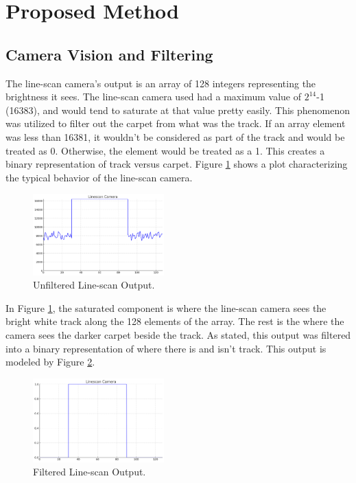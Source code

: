 \documentclass[conference]{IEEEtran}
\begin{document}
\section{Proposed Method}

\subsection{Camera Vision and Filtering}

The line-scan camera's output is an array of 128 integers representing the brightness it sees. The line-scan camera used had a maximum value of $2^{14}$-1 (16383), and would tend to saturate at that value pretty easily. This phenomenon was utilized to filter out the carpet from what was the track. If an array element was less than 16381, it wouldn't be considered as part of the track and would be treated as 0. Otherwise, the element would be treated as a 1. This creates a binary representation of track versus carpet. Figure \ref{fig:linescan} shows a plot characterizing the typical behavior of the line-scan camera.

\begin{figure}[htbp]
	\centerline{\includegraphics[width=0.45\textwidth]{images/linescan.png}}
	\caption{Unfiltered Line-scan Output.}
	\label{fig:linescan}
\end{figure}

In Figure \ref{fig:linescan}, the saturated component is where the line-scan camera sees the bright white track along the 128 elements of the array. The rest is the where the camera sees the darker carpet beside the track. As stated, this output was filtered into a binary representation of where there is and isn't track. This output is modeled by Figure \ref{fig:linescanFiltered}.

\begin{figure}[htbp]
	\centerline{\includegraphics[width=0.45\textwidth]{images/linescanFiltered.png}}
	\caption{Filtered Line-scan Output.}
	\label{fig:linescanFiltered}
\end{figure}
\end{document}
